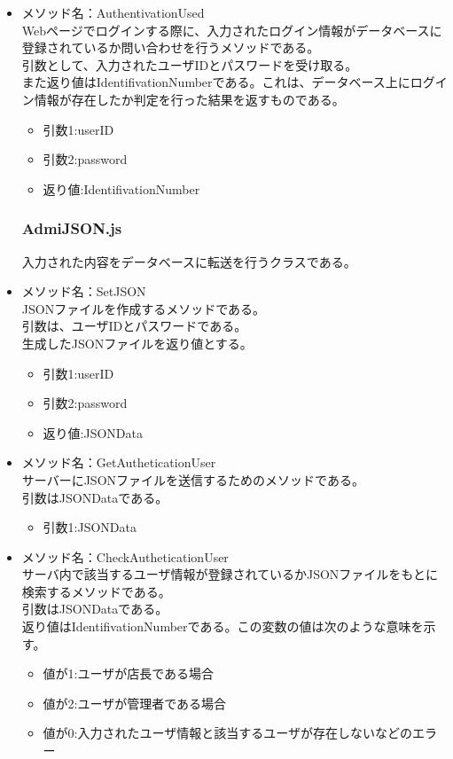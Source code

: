 \documentclass[a4j]{jarticle}
\begin{document}
\begin{itemize}

\item メソッド名：AuthentivationUsed\\

Webページでログインする際に、入力されたログイン情報がデータベースに登録されているか問い合わせを行うメソッドである。\\
引数として、入力されたユーザIDとパスワードを受け取る。\\
また返り値はIdentifivationNumberである。これは、データベース上にログイン情報が存在したか判定を行った結果を返すものである。\\

	\begin{itemize}
		\item 引数1:userID
		\item 引数2:password
		\item 返り値:IdentifivationNumber
	\end{itemize}
	\subsubsection{AdmiJSON.js}
入力された内容をデータベースに転送を行うクラスである。
\item メソッド名：SetJSON\\

JSONファイルを作成するメソッドである。\\引数は、ユーザIDとパスワードである。\\生成したJSONファイルを返り値とする。
	\begin{itemize}
		\item 引数1:userID
		\item 引数2:password
		\item 返り値:JSONData
	\end{itemize}
\item メソッド名：GetAutheticationUser\\

サーバーにJSONファイルを送信するためのメソッドである。\\
引数はJSONDataである。
	\begin{itemize}
		\item 引数1:JSONData
	\end{itemize}
	
\item メソッド名：CheckAutheticationUser\\

サーバ内で該当するユーザ情報が登録されているかJSONファイルをもとに検索するメソッドである。\\
引数はJSONDataである。\\
返り値はIdentifivationNumberである。この変数の値は次のような意味を示す。
	\begin{itemize}
		\item 値が1:ユーザが店長である場合
		\item 値が2:ユーザが管理者である場合
		\item 値が0:入力されたユーザ情報と該当するユーザが存在しないなどのエラー
	\end{itemize}



\end{itemize}
\end{document}
